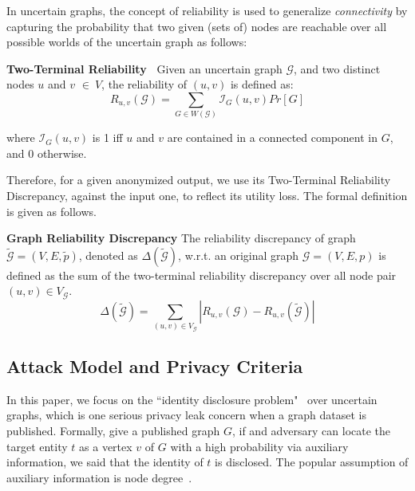 In uncertain graphs, the concept of reliability is used to generalize \emph{connectivity} by  capturing the probability that two given (sets of) nodes are reachable over all possible worlds of the uncertain graph as follows:
\begin{definition}
    \textbf{Two-Terminal Reliability~\cite{Colbourn_Colbourn_1987}}  Given an uncertain graph $\mathcal{G}$, and two distinct nodes $u$ and $v$  $\in~V$, the reliability of $(u,v)$ is defined as:
        \begin{equation*}
                R_{u,v}(\mathcal{G})= \sum_{G \in W(\mathcal{G})}  \mathcal{I}_{G}(u,v) Pr[G] 
        \end{equation*}
        
    where $\mathcal{I}_{G}(u,v)$ is 1 iff $u$ and $v$ are contained in a connected component in $G$, and 0 otherwise.   
    \label{d:reliability}
\end{definition}

Therefore, for a given anonymized output, we use its Two-Terminal Reliability Discrepancy, against the input one, to reflect its utility loss. The formal definition is given as follows. 
\theoremstyle{definition}
\begin{definition}
    \textbf{Graph Reliability Discrepancy}
        The reliability discrepancy of graph $\tilde{\mathcal{G}}=(V,E, \tilde{\mathit{p}})$, 
    denoted as $\Delta(\tilde{\mathcal{G}})$, 
    w.r.t. an original graph  $\mathcal{G}=(V,E,\mathit{p})$  is 
    defined as the sum of the two-terminal reliability discrepancy over all node pair $(u,v) \in V_\mathcal{G}$.
    \begin{equation*}
        \Delta(\tilde{\mathcal{G}})=\sum_{(u,v) \in V_\mathcal{G} } |R_{u,v}(\mathcal{G})-R_{u,v}(\tilde{\mathcal{G}})|
    \end{equation*}
\end{definition}


\subsection{Attack Model and Privacy Criteria}
\label{sec:AMPC}
In this paper, we focus on the ``identity disclosure problem"~\cite{Liu_Towards_2008} over uncertain graphs, which is one serious privacy leak concern when a graph dataset is published. Formally, give a published graph $G$, if and adversary can locate the target entity $t$ as a vertex $v$ of $G$ with a high probability via auxiliary information, we said that the identity of $t$ is disclosed. The popular assumption of auxiliary information is node degree~\cite{Liu_Towards_2008}. 

